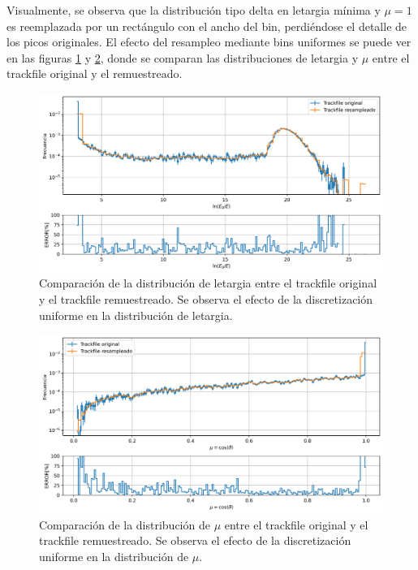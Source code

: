 Visualmente, se observa que la distribución tipo delta en letargia mínima y $\mu = 1$ es reemplazada por un rectángulo con el ancho del bin, perdiéndose el detalle de los picos originales. El efecto del resampleo mediante bins uniformes se puede ver en las figuras \ref{fig:trackfile1_config1_letargia} y \ref{fig:trackfile1_config1_mu}, donde se comparan las distribuciones de letargia y $\mu$ entre el trackfile original y el remuestreado.

\begin{figure}[H]
    \centering
    \includegraphics[width=\textwidth]{figs/fig4_4.png}
    \caption{Comparación de la distribución de letargia entre el trackfile original y el trackfile remuestreado. Se observa el efecto de la discretización uniforme en la distribución de letargia.}
    \label{fig:trackfile1_config1_letargia}
\end{figure}

\begin{figure}[H]
    \centering
    \includegraphics[width=\textwidth]{figs/fig4_5.png}
    \caption{Comparación de la distribución de $\mu$ entre el trackfile original y el trackfile remuestreado. Se observa el efecto de la discretización uniforme en la distribución de $\mu$.}
    \label{fig:trackfile1_config1_mu}
\end{figure}

